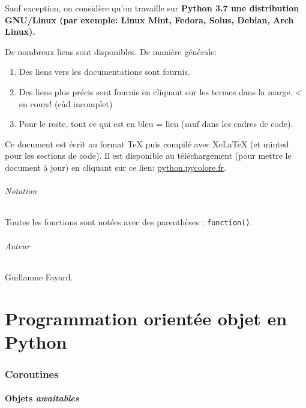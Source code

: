 \documentclass[a4paper, 10pt]{article}
\begin{document}
Sauf exception, on considère qu'on travaille sur \bfseries{Python 3.7} une distribution GNU/Linux (par exemple: Linux Mint, Fedora, Solus, Debian, Arch Linux).\bigskip

De nombreux liens sont disponibles. De manière générale:
\begin{enumerate}
    \item Des liens vers les documentations sont fournis.
    \item Des liens plus précis sont fournis en cliquant sur les termes dans la marge. < en cours! (càd incomplet)
    \item Pour le reste, tout ce qui est en bleu = lien (sauf dans les cadres de code).
\end{enumerate}\bigskip

Ce document est écrit au format TeX puis compilé avec XeLaTeX (et minted pour les sections de code). Il est disponible au téléchargement (pour mettre le document à jour) en cliquant sur ce lien: \href{https://python.pycolore.fr}{python.pycolore.fr}.

\paragraph{Notation} Toutes les fonctions sont notées avec des parenthèses : \texttt{function()}.
\bigskip

\paragraph{Auteur} Guillaume Fayard.

\newpage
\part{Programmation orientée objet en Python}









\section{Coroutines}
\subsection{Objets \emph{awaitables}}


\end{document}
